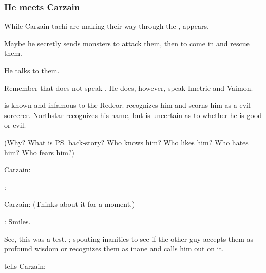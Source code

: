 \subsubsection{He meets Carzain}
While Carzain-tachi are making their way through the \Wylde{}, \Ishnaruchaefir{} appears. 

Maybe he secretly sends monsters to attack them, then to come in and rescue them. 

He talks to them.

Remember that \Ishnaruchaefir{} does not speak \Velcadian. 
He does, however, speak Imetric and Vaimon. 

\Ishnaruchaefir{} is known and infamous to the Redcor. 
\Esmerel{} recognizes him and scorns him as a evil sorcerer. 
Northstar recognizes his name, but is uncertain as to whether he is good or evil. 

(Why? 
What is \ps{\Ishnaruchaefir} back-story? 
Who knows him? 
Who likes him? 
Who hates him? 
Who fears him?)


Carzain: 

\Ishnaruchaefir{}: 

Carzain: (Thinks about it for a moment.) 

\Ishnaruchaefir:  Smiles. 

See, this was a test. 
\Ishnaruchaefir{} ; spouting inanities to see if the other guy accepts them as profound wisdom or recognizes them as inane and calls him out on it. 

\Ishnaruchaefir{} tells Carzain: 

